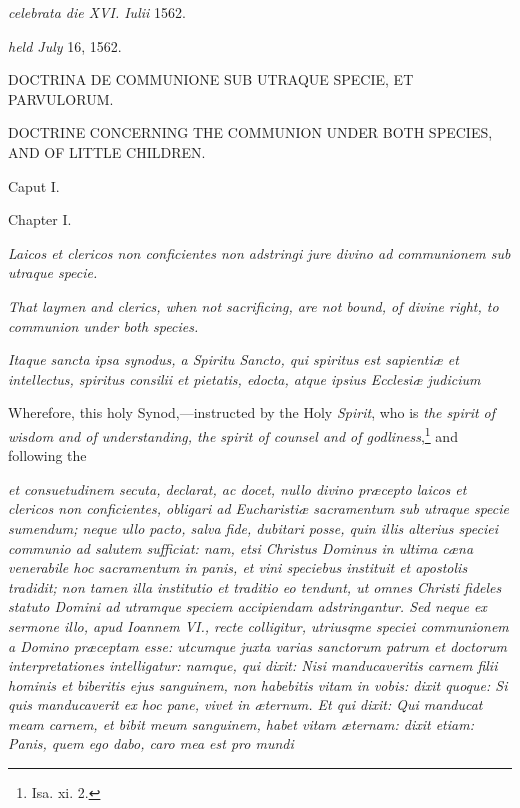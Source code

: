 \emph{celebrata die XVI. Iulii} 1562.

\emph{held July} 16, 1562.

DOCTRINA DE COMMUNIONE SUB UTRAQUE SPECIE, ET PARVULORUM.

DOCTRINE CONCERNING THE COMMUNION UNDER BOTH SPECIES, AND OF LITTLE CHILDREN.

Caput I.

Chapter I.

\emph{Laicos et clericos non conficientes non adstringi jure divino ad communionem sub utraque specie.}

\emph{That laymen and clerics, when not sacrificing, are not bound, of divine right, to communion under both species.}

\emph{Itaque sancta ipsa synodus, a Spiritu Sancto, qui spiritus est sapientiæ et intellectus, spiritus consilii et pietatis, edocta, atque ipsius Ecclesiæ judicium }

Wherefore, this holy Synod,—instructed by the Holy \emph{Spirit}, who is \emph{the spirit of wisdom and of understanding, the spirit of counsel and of godliness},\footnote{\par   Isa. xi. 2.} and following the

\emph{et consuetudinem secuta, declarat, ac docet, nullo divino præcepto laicos et clericos non conficientes, obligari ad Eucharistiæ sacramentum sub utraque specie sumendum; neque ullo pacto, salva fide, dubitari posse, quin illis alterius speciei communio ad salutem sufficiat: nam, etsi Christus Dominus in ultima cæna venerabile hoc sacramentum in panis, et vini speciebus instituit et apostolis tradidit; non tamen illa institutio et traditio eo tendunt, ut omnes Christi fideles statuto Domini ad utramque speciem accipiendam adstringantur. Sed neque ex sermone illo, apud Ioannem VI., recte colligitur, utriusqme speciei communionem a Domino præceptam esse: utcumque juxta varias sanctorum patrum et doctorum interpretationes intelligatur: namque, qui dixit: Nisi manducaveritis carnem filii hominis et biberitis ejus sanguinem, non habebitis vitam in vobis: dixit quoque: Si quis manducaverit ex hoc pane, vivet in æternum. Et qui dixit: Qui manducat meam carnem, et bibit meum sanguinem, habet vitam æternam: dixit etiam: Panis, quem ego dabo, caro mea est pro mundi }

